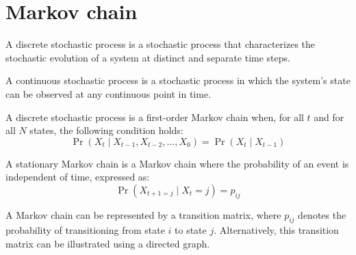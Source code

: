 \section{Markov chain}

\begin{definition}
    A discrete stochastic process is a stochastic process that characterizes the stochastic evolution of a system at distinct and separate time steps.
\end{definition}
\begin{definition}
    A continuous stochastic process is a stochastic process in which the system's state can be observed at any continuous point in time.
\end{definition}
\begin{definition}
    A discrete stochastic process is a first-order Markov chain when, for all $t$ and for all $N$ states, the following condition holds:    \[\Pr\left(X_t\mid X_{t-1},X_{t-2},\dots,X_0\right)=\Pr(X_t\mid X_{t-1})\] 
\end{definition}
\begin{definition}
    A stationary Markov chain is a Markov chain where the probability of an event is independent of time, expressed as:
    \[\Pr\left(X_{t+1=j}\mid X_t=j\right)=p_{ij}\] 
\end{definition}

A Markov chain can be represented by a transition matrix, where $p_{ij}$ denotes the probability of transitioning from state $i$ to state $j$. 
Alternatively, this transition matrix can be illustrated using a directed graph.

